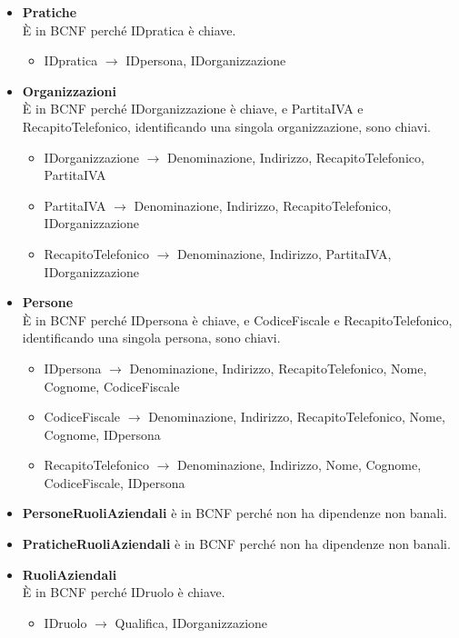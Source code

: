 \documentclass[a4paper,12pt]{article}
\begin{document}
\begin{itemize}
\item \textbf{Pratiche}\\È in BCNF perché IDpratica è chiave.
\begin{itemize}
\item IDpratica $\rightarrow$ IDpersona, IDorganizzazione
\end{itemize}

\item \textbf{Organizzazioni}\\È in BCNF perché IDorganizzazione è chiave, e PartitaIVA e RecapitoTelefonico, identificando una singola organizzazione, sono chiavi.
\begin{itemize}
\item IDorganizzazione $\rightarrow$ Denominazione, Indirizzo, RecapitoTelefonico, PartitaIVA
\item PartitaIVA $\rightarrow$ Denominazione, Indirizzo, RecapitoTelefonico, IDorganizzazione
\item RecapitoTelefonico $\rightarrow$ Denominazione, Indirizzo, PartitaIVA, IDorganizzazione
\end{itemize}

\item \textbf{Persone}\\È in BCNF perché IDpersona è chiave, e CodiceFiscale e RecapitoTelefonico, identificando una singola persona, sono chiavi.
\begin{itemize}
\item IDpersona $\rightarrow$ Denominazione, Indirizzo, RecapitoTelefonico, Nome, Cognome, CodiceFiscale
\item CodiceFiscale $\rightarrow$ Denominazione, Indirizzo, RecapitoTelefonico, Nome, Cognome, IDpersona
\item RecapitoTelefonico $\rightarrow$ Denominazione, Indirizzo, Nome, Cognome, CodiceFiscale, IDpersona
\end{itemize}

\item \textbf{PersoneRuoliAziendali} è in BCNF perché non ha dipendenze non banali.

\item \textbf{PraticheRuoliAziendali} è in BCNF perché non ha dipendenze non banali.

\item \textbf{RuoliAziendali}\\È in BCNF perché IDruolo è chiave.
\begin{itemize}
\item IDruolo $\rightarrow$ Qualifica, IDorganizzazione
\end{itemize}


\end{itemize}
\end{document}
